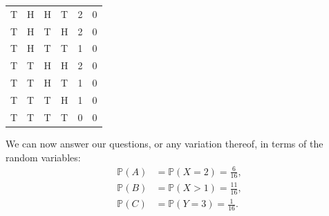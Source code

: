 \documentclass{article}
\begin{document}
\begin{testexample}
\begin{center}
\begin{tabular}{@{}llll|ll}
T&H&H&T&2&0\\
T&H&T&H&2&0\\
T&H&T&T&1&0\\
T&T&H&H&2&0\\
T&T&H&T&1&0\\
T&T&T&H&1&0\\
T&T&T&T&0&0\\ \bottomrule
\end{tabular}
\end{center}
We can now answer our questions, or any variation thereof, in terms of the random variables:
\begin{align}
    \mathbb{P}(A)&=\mathbb{P}(X=2)=\frac{6}{16},\\
    \mathbb{P}(B)&=\mathbb{P}(X>1)=\frac{11}{16},\\
    \mathbb{P}(C)&=\mathbb{P}(Y=3)=\frac{1}{16}.
\end{align}
\end{testexample}
\end{document}
